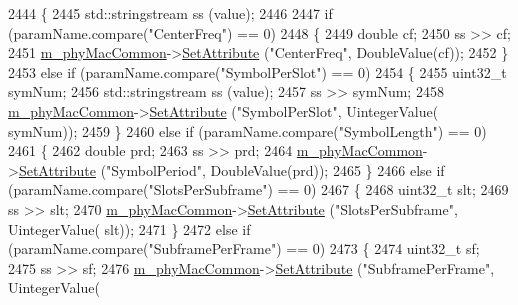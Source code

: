 \begin{DoxyCode}
2444 \{
2445         std::stringstream ss (value);
2446 
2447         \textcolor{keywordflow}{if} (paramName.compare(\textcolor{stringliteral}{"CenterFreq"}) == 0)
2448         \{
2449                 \textcolor{keywordtype}{double} cf;
2450                 ss >> cf;
2451                 \hyperlink{classns3_1_1MmWaveHelper_a6aaa35de743b9a88998de0128b1046b4}{m\_phyMacCommon}->\hyperlink{classns3_1_1ObjectBase_ac60245d3ea4123bbc9b1d391f1f6592f}{SetAttribute} (\textcolor{stringliteral}{"CenterFreq"}, DoubleValue(cf));
2452         \}
2453         \textcolor{keywordflow}{else} \textcolor{keywordflow}{if} (paramName.compare(\textcolor{stringliteral}{"SymbolPerSlot"}) == 0)
2454         \{
2455                 uint32\_t symNum;
2456                 std::stringstream ss (value);
2457                 ss >> symNum;
2458                 \hyperlink{classns3_1_1MmWaveHelper_a6aaa35de743b9a88998de0128b1046b4}{m\_phyMacCommon}->\hyperlink{classns3_1_1ObjectBase_ac60245d3ea4123bbc9b1d391f1f6592f}{SetAttribute} (\textcolor{stringliteral}{"SymbolPerSlot"}, UintegerValue(
      symNum));
2459         \}
2460         \textcolor{keywordflow}{else} \textcolor{keywordflow}{if} (paramName.compare(\textcolor{stringliteral}{"SymbolLength"}) == 0)
2461         \{
2462                 \textcolor{keywordtype}{double} prd;
2463                 ss >> prd;
2464                 \hyperlink{classns3_1_1MmWaveHelper_a6aaa35de743b9a88998de0128b1046b4}{m\_phyMacCommon}->\hyperlink{classns3_1_1ObjectBase_ac60245d3ea4123bbc9b1d391f1f6592f}{SetAttribute} (\textcolor{stringliteral}{"SymbolPeriod"}, DoubleValue(prd));
2465         \}
2466         \textcolor{keywordflow}{else} \textcolor{keywordflow}{if} (paramName.compare(\textcolor{stringliteral}{"SlotsPerSubframe"}) == 0)
2467         \{
2468                 uint32\_t slt;
2469                 ss >> slt;
2470                 \hyperlink{classns3_1_1MmWaveHelper_a6aaa35de743b9a88998de0128b1046b4}{m\_phyMacCommon}->\hyperlink{classns3_1_1ObjectBase_ac60245d3ea4123bbc9b1d391f1f6592f}{SetAttribute} (\textcolor{stringliteral}{"SlotsPerSubframe"}, UintegerValue(
      slt));
2471         \}
2472         \textcolor{keywordflow}{else} \textcolor{keywordflow}{if} (paramName.compare(\textcolor{stringliteral}{"SubframePerFrame"}) == 0)
2473         \{
2474                 uint32\_t sf;
2475                 ss >> sf;
2476                 \hyperlink{classns3_1_1MmWaveHelper_a6aaa35de743b9a88998de0128b1046b4}{m\_phyMacCommon}->\hyperlink{classns3_1_1ObjectBase_ac60245d3ea4123bbc9b1d391f1f6592f}{SetAttribute} (\textcolor{stringliteral}{"SubframePerFrame"}, UintegerValue(

\end{DoxyCode}
